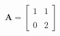 \documentclass[preview]{standalone}
\begin{document}
\begin{align*}
\mathbf{A} = \begin{bmatrix} 1  &  1 \\\\ 0 & 2 \end{bmatrix}
\end{align*}
\end{document}
